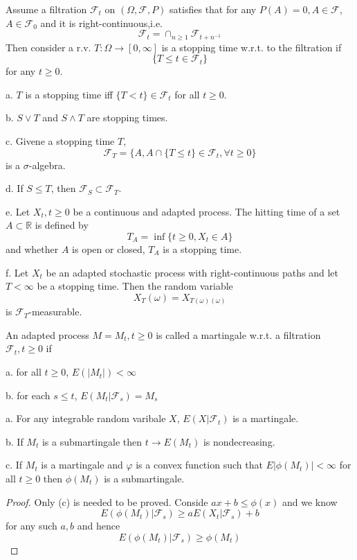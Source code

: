 \documentclass[lang=en, color=blue, ]{elegantbook}
\newcommand{\F}{\mathcal{F}}
\newcommand{\R}{\mathbb{R}}
\begin{document}
\begin{definition}
    Assume a filtration $\F_t$ on $(\Omega,\F,P)$ satisfies that for any $P(A) = 0,A\in\F$, $A\in\F_0$ and it is right-continuous,i.e.
    \[\F_t = \cap_{n\geq 1}\F_{t+n^{-1}}\]
    Then consider a r.v. $T:\Omega\to[0,\infty]$ is a stopping time w.r.t. to the filtration if
    \[\{T\leq t\in\F_t\}\]
    for any $t\geq 0$.
\end{definition}

\begin{proposition}
    a. $T$ is a stopping time iff $\{T<t\} \in \F_t$ for all $t\geq 0$.\par
    b. $S\vee T$ and $S\wedge T$ are stopping times.\par
    c. Givene a stopping time $T$,
    \[\F_T = \{A, A\cap\{T\leq t\} \in \F_t, \forall t\geq 0\}\]
    is a $\sigma$-algebra.\par
    d. If $S\leq T$, then $\F_S\subset \F_T$.\par
    e. Let $X_t, t\geq 0$ be a continuous and adapted process. The hitting time of a set $A\subset \R$ is defined by
    \[T_A = \inf\{t\geq 0,X_t \in A\}\]
    and whether $A$ is open or closed, $T_A$ is a stopping time.\par
    f. Let $X_t$ be an adapted stochastic process with right-continuous paths and let $T<\infty$ be a stopping time. Then the random variable
    \[X_T(\omega) = X_{T(\omega)(\omega)}\]
    is $\F_T$-measurable.
\end{proposition}

\begin{definition}
    An adapted process $M = M_t,t\geq 0$ is called a martingale w.r.t. a filtration $\F_t,t\geq 0$ if\par
    a. for all $t\geq 0$, $E(|M_t|) < \infty$\par
    b. for each $s\leq t$, $E(M_t|\F_s) = M_s$
\end{definition}

\begin{proposition}
    a. For any integrable random varibale $X$, $E(X|\F_t)$ is a martingale.\par
    b. If $M_t$ is a submartingale then $t\to E(M_t)$ is nondecreasing.\par
    c. If $M_t$ is a martingale and $\varphi$ is a convex function such that $E|\phi(M_t)| < \infty$ for all $t\geq 0$ then $\phi(M_t)$ is a submartingale. 
\end{proposition}
\begin{proof}
    Only (c) is needed to be proved. Conside $ax+b \leq \phi(x)$ and we know
    \[E(\phi(M_t)|\F_s) \geq aE(X_t|\F_s) + b \]
    for any such $a,b$ and hence
    \[E(\phi(M_t)|\F_s) \geq \phi(M_t)\]
\end{proof}
\end{document}
